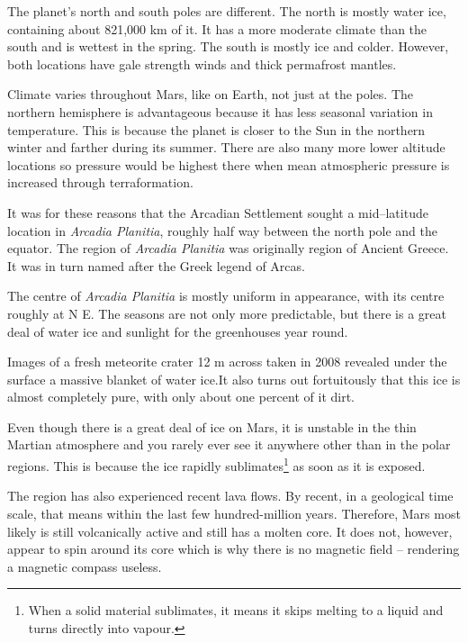 
The planet's north and south poles are different. The north is mostly water ice, containing about 821,000 km of it. It has a more moderate climate than the south and is wettest in the spring. The south is mostly  ice and colder. However, both locations have gale strength winds and thick permafrost mantles.

Climate varies throughout Mars, like on Earth, not just at the poles. The northern hemisphere is advantageous because it has less seasonal variation in temperature. This is because the planet is closer to the Sun in the northern winter and farther during its summer. There are also many more lower altitude locations so pressure would be highest there when mean atmospheric pressure is increased through terraformation.

It was for these reasons that the Arcadian Settlement sought a mid--latitude location in {\it Arcadia Planitia}, roughly half way between the north pole and the equator. The region of {\it Arcadia Planitia} was originally region of Ancient Greece. It was in turn named after the Greek legend of Arcas.

The centre of {\it Arcadia Planitia} is mostly uniform in appearance, with its centre roughly at N E. The seasons are not only more predictable, but there is a great deal of water ice and sunlight for the greenhouses year round.

Images of a fresh meteorite crater 12 m across taken in 2008 revealed under the surface a massive blanket of water ice. It also turns out fortuitously that this ice is almost completely pure, with only about one percent of it dirt.

Even though there is a great deal of ice on Mars, it is unstable in the thin Martian atmosphere and you rarely ever see it anywhere other than in the polar regions. This is because the ice rapidly sublimates\footnote{When a solid material sublimates, it means it skips melting to a liquid and turns directly into vapour.} as soon as it is exposed.

The region has also experienced recent lava flows. By recent, in a geological time scale, that means within the last few hundred-million years. Therefore, Mars most likely is still volcanically active and still has a molten core. It does not, however, appear to spin around its core which is why there is no magnetic field -- rendering a magnetic compass useless.

